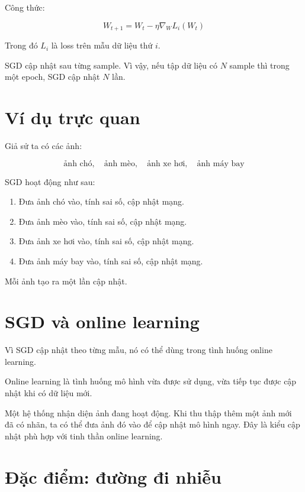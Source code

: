 \documentclass[12pt,a4paper]{report}
\begin{document}
Công thức:

\[
    W_{t+1}
    =
    W_t
    -
    \eta \nabla_W L_i(W_t)
\]

Trong đó $L_i$ là loss trên mẫu dữ liệu thứ $i$.

\begin{ghinho}
SGD cập nhật sau từng sample. Vì vậy, nếu tập dữ liệu có $N$ sample thì trong một epoch, SGD cập nhật $N$ lần.
\end{ghinho}

\section{Ví dụ trực quan}

Giả sử ta có các ảnh:

\[
    \text{ảnh chó},\quad
    \text{ảnh mèo},\quad
    \text{ảnh xe hơi},\quad
    \text{ảnh máy bay}
\]

SGD hoạt động như sau:

\begin{enumerate}
    \item Đưa ảnh chó vào, tính sai số, cập nhật mạng.
    \item Đưa ảnh mèo vào, tính sai số, cập nhật mạng.
    \item Đưa ảnh xe hơi vào, tính sai số, cập nhật mạng.
    \item Đưa ảnh máy bay vào, tính sai số, cập nhật mạng.
\end{enumerate}

Mỗi ảnh tạo ra một lần cập nhật.

\section{SGD và online learning}

Vì SGD cập nhật theo từng mẫu, nó có thể dùng trong tình huống online learning.

Online learning là tình huống mô hình vừa được sử dụng, vừa tiếp tục được cập nhật khi có dữ liệu mới.

\begin{vidu}
Một hệ thống nhận diện ảnh đang hoạt động. Khi thu thập thêm một ảnh mới đã có nhãn, ta có thể đưa ảnh đó vào để cập nhật mô hình ngay. Đây là kiểu cập nhật phù hợp với tinh thần online learning.
\end{vidu}

\section{Đặc điểm: đường đi nhiễu}
\end{document}

